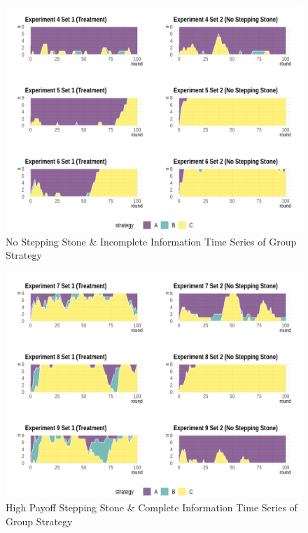\begin{figure}[h]
\captionsetup{justification=centering}
  \caption{No Stepping Stone \& Incomplete Information Time Series of Group Strategy}
   \label{fig:Series1I}
    \includegraphics[width = \textwidth]{Images/AllAreaPlot1I.png}
    
\end{figure}

\begin{figure}[h]
\captionsetup{justification=centering}
  \caption{High Payoff Stepping Stone \& Complete Information Time Series of Group Strategy}
   \label{fig:Series2C}
    \includegraphics[width = \textwidth]{Images/AllAreaPlot2C.png}
    
\end{figure}

